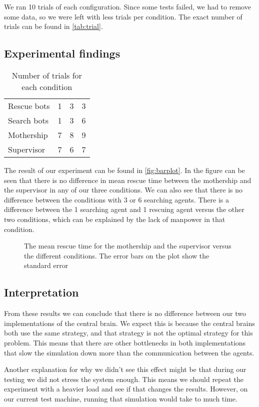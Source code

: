 We ran 10 trials of each configuration. Since some tests failed, we had to
remove some data, so we were left with less trials per condition. The exact
number of trials can be found in \autoref{tab:trial}.

\subsection{Experimental findings}

\begin{table}
    \centering
    \caption{Number of trials for each condition}
    \label{tab:trial}
    \begin{tabular}{l|ccc}
        Rescue bots & 1 & 3 & 3 \\
        Search bots & 1 & 3 & 6 \\ \hline
        Mothership  & 7 & 8 & 9 \\
        Supervisor  & 7 & 6 & 7
    \end{tabular}
\end{table}

The result of our experiment can be found in \autoref{fig:barplot}. In the
figure can be seen that there is no difference in mean rescue time between
the mothership and the supervisor in any of our three conditions. We can
also see that there is no difference between the conditions with 3 or 6
searching agents. There is a difference between the 1 searching agent and 1
rescuing agent versus the other two conditions, which can be explained by
the lack of manpower in that condition. 

\begin{figure}
    \centering
    \resizebox{\textwidth}{!}{
        }
    \caption{The mean rescue time for the mothership and the supervisor
        versus the different conditions. The error bars on the plot show
        the standard error}
    \label{fig:barplot}
\end{figure}

\subsection{Interpretation}
From these results we can conclude that there is no difference between our
two implementations of the central brain. We expect this is because the
central brains both use the same strategy, and that strategy is not the
optimal strategy for this problem. This means that there are other
bottlenecks in both implementations that slow the simulation down more
than the communication between the agents. 

Another explanation for why we didn't see this effect might be that during our
testing we did not stress the system enough. This means we should repeat
the experiment with a heavier load and see if that changes the results.
However, on our current test machine, running that simulation would take to
much time. 
